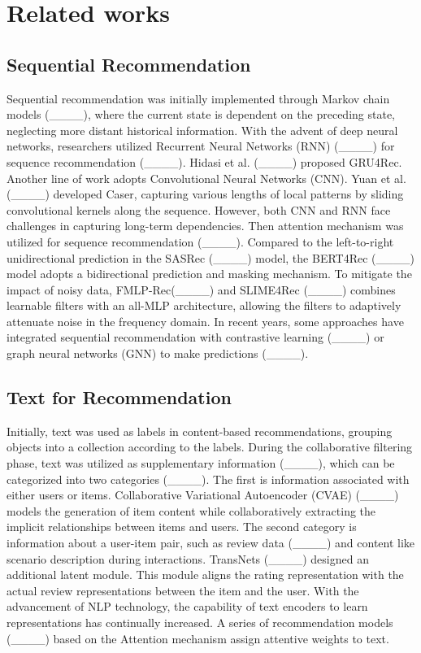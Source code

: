 \section{Related works}
\subsection{Sequential Recommendation}Sequential recommendation was initially implemented through Markov chain models (____), where the current state is dependent on the preceding state, neglecting more distant historical information. With the advent of deep neural networks, researchers utilized Recurrent Neural Networks (RNN) (____) for sequence recommendation (____). Hidasi et al. (____) proposed GRU4Rec. Another line of work adopts Convolutional Neural Networks (CNN). Yuan et al. (____) developed Caser, capturing various lengths of local patterns by sliding convolutional kernels along the sequence. However, both CNN and RNN face challenges in capturing long-term dependencies. Then attention mechanism was utilized for sequence recommendation (____). Compared to the left-to-right unidirectional prediction in the SASRec (____) model, the BERT4Rec (____) model adopts a bidirectional prediction and masking mechanism. To mitigate the impact of noisy data, FMLP-Rec(____) and SLIME4Rec (____) combines learnable filters with an all-MLP architecture, allowing the filters to adaptively attenuate noise in the frequency domain. In recent years, some approaches have integrated sequential recommendation with contrastive learning (____) or graph neural networks (GNN) to make predictions (____). 

\subsection{Text for Recommendation}Initially, text was used as labels in content-based recommendations, grouping objects into a collection according to the labels. During the collaborative filtering phase, text was utilized as supplementary information (____), which can be categorized into two categories (____). The first is information associated with either users or items. Collaborative Variational Autoencoder (CVAE) (____) models the generation of item content while collaboratively extracting the implicit relationships between items and users. The second category is information about a user-item pair, such as review data (____) and content like scenario description during interactions. TransNets (____) designed an additional latent module. This module aligns the rating representation with the actual review representations between the item and the user. With the advancement of NLP technology, the capability of text encoders to learn representations has continually increased. A series of recommendation models (____) based on the Attention mechanism assign attentive weights to text. 


